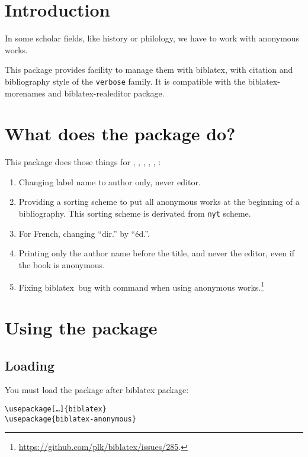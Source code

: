 \documentclass{ltxdockit}[2011/03/25]
\newcommand{\biblatex}{biblatex\xspace}
\newcommand{\namebibstyle}[1]{\texttt{#1}}
\begin{document}
\printtitlepage
\tableofcontents

\section{Introduction}

In some scholar fields, like history or philology, we have to work with anonymous works. 

This package provides facility to manage them with \biblatex, with citation and bibliography style of the \namebibstyle{verbose} family.
It is compatible with the biblatex-morenames and biblatex-realeditor package. 

\section{What does the package do?}

This package does those things for  , , , , , :
\begin{enumerate}
	

	\item Changing label name to author only, never editor.
	\item Providing a sorting scheme to put all anonymous works at the beginning of a bibliography. This sorting scheme is derivated from \verb+nyt+ scheme.
	\item For French, changing \enquote{dir.} by \enquote{éd.}.
	\item Printing only the author name  before the title, and never the editor, even if the book is anonymous.
 	\item Fixing \biblatex\ bug with  \expandafter\cs\expandafter{\prm{xx}cites} command when using anonymous works.\footnote{\url{https://github.com/plk/biblatex/issues/285}.}
		
\end{enumerate}

\section{Using the package}

\subsection{Loading}
You must load the package after \biblatex package:
\begin{verbatim}
\usepackage[…]{biblatex}
\usepackage{biblatex-anonymous}
\end{verbatim}
\end{document}
